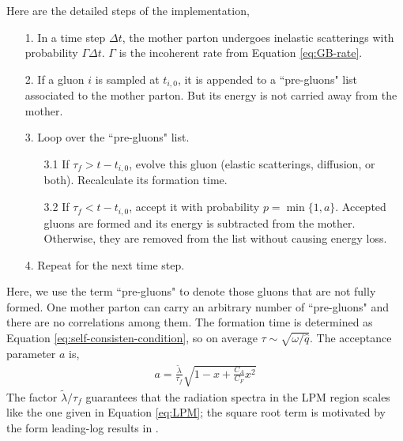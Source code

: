 \documentclass[aps, prc, reprint, amsmath, groupedaddress, nofootinbib]{revtex4-1}
\begin{document}
Here are the detailed steps of the implementation,
\begin{itemize}
\item[1.] In a time step $\Delta t$, the mother parton undergoes inelastic scatterings with probability $\Gamma\Delta t$. $\Gamma$ is the incoherent rate from Equation \ref{eq:GB-rate}.
\item[2.] If a gluon $i$ is sampled at $t_{i,0}$, it is appended to a ``pre-gluons" list associated to the mother parton. But its energy is not carried away from the mother.
\item[3.] Loop over the ``pre-gluons" list. 
\begin{itemize}
\item[3.1] If $\tau_f > t-t_{i,0}$, evolve this gluon (elastic scatterings, diffusion, or both). Recalculate its formation time.
\item[3.2] If $\tau_f < t-t_{i,0}$, accept it with probability $p = \min\{1, a\}$. Accepted gluons are formed and its energy is subtracted from the mother. Otherwise, they are removed from the list without causing energy loss.
\end{itemize} 
\item[4.] Repeat for the next time step.
\end{itemize}
Here, we use the term ``pre-gluons" to denote those gluons that are not fully formed.
One mother parton can carry an arbitrary number of ``pre-gluons" and there are no correlations among them.
The formation time is determined as Equation \ref{eq:self-consisten-condition}, so on average $\tau \sim \sqrt{\omega/\hat{q}}$.
The acceptance parameter $a$ is,
\begin{eqnarray}
a = \frac{\tilde{\lambda}}{\tau_f} \sqrt{1-x+\frac{C_A}{C_F}x^2}
\end{eqnarray}  
The factor $\tilde{\lambda}/\tau_f$ guarantees that the radiation spectra in the LPM region scales like the one given in Equation \ref{eq:LPM}; the square root term is motivated by the form leading-log results in \cite{Arnold:2008zu}.
\end{document}
